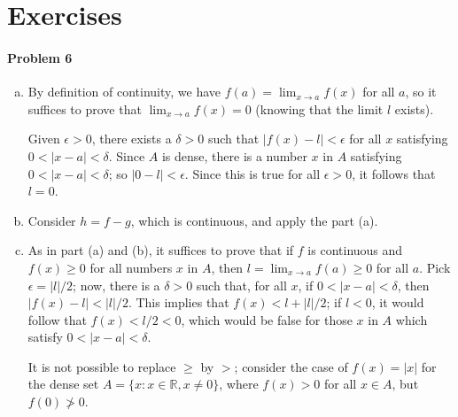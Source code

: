 \documentclass{article}
\begin{document}
\section*{Exercises}

\paragraph{Problem 6}
\begin{enumerate}[(a)]
  \item By definition of continuity, we have $f(a) = \lim_{x \to a} f(x)$ for
    all $a$, so it suffices to prove that $\lim_{x \to a} f(x) = 0$ (knowing
    that the limit $l$ exists).

    Given $\epsilon > 0$, there exists a $\delta > 0$ such that $|f(x) - l| <
    \epsilon$ for all $x$ satisfying $0 < |x - a| < \delta$. Since $A$ is
    dense, there is a number $x$ in $A$ satisfying $0 < |x - a| < \delta$; so
    $|0 - l| < \epsilon$. Since this is true for all $\epsilon > 0$, it follows
    that $l = 0$.
  \item Consider $h = f - g$, which is continuous, and apply the part (a).
  \item As in part (a) and (b), it suffices to prove that if $f$ is continuous
    and $f(x) \geq 0$ for all numbers $x$ in $A$, then $l = \lim_{x \to a} f(a)
    \geq 0$ for all $a$. Pick $\epsilon = |l|/2$; now, there is a $\delta > 0$
    such that, for all $x$, if $0 < |x - a| < \delta$, then $|f(x) - l| <
    |l|/2$. This implies that $f(x) < l + |l|/2$; if $l < 0$, it would follow
    that $f(x) < l/2 < 0$, which would be false for those $x$ in $A$ which
    satisfy $0 < |x - a| < \delta$.

    It is not possible to replace $\geq$ by $>$; consider the case of $f(x) =
    |x|$ for the dense set $A = \{x : x \in \mathbb{R}, x \neq 0\}$, where
    $f(x) > 0$ for all $x \in A$, but $f(0) \ngtr 0$.
\end{enumerate}
\end{document}
